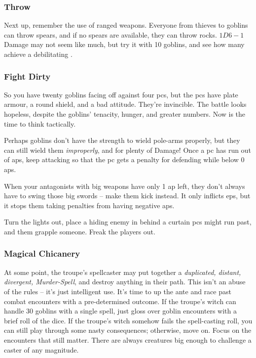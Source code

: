 \begin{multicols}{2}
\subsubsection{Throw}

Next up, remember the use of ranged weapons.
Everyone from thieves to goblins can throw spears, and if no spears are available, they can throw rocks.
$1D6-1$ Damage may not seem like much, but try it with 10 goblins, and see how many achieve a debilitating .

\subsubsection{Fight Dirty}

So you have twenty goblins facing off against four \glspl{pc}, but the \glspl{pc} have plate armour, a round shield, and a bad attitude.
They're invincible.
The battle looks hopeless, despite the goblins' tenacity, hunger, and greater numbers.
Now is the time to think tactically.

Perhaps goblins don't have the strength to wield pole-arms properly, but they can still wield them \emph{improperly}, and for plenty of Damage!
Once a \gls{pc} has run out of \glspl{ap}, keep attacking so that the \gls{pc} gets a penalty for defending while below 0 \glspl{ap}.

When your antagonists with big weapons have only 1 \gls{ap} left, they don't always have to swing those big swords -- make them kick instead.
It only inflicts \glspl{ep}, but it stops them taking penalties from having negative \glspl{ap}.

Turn the lights out, place a hiding enemy in behind a curtain \glspl{pc} might run past, and them grapple someone.
Freak the players out.

\subsubsection{Magical Chicanery}

At some point, the troupe's spellcaster may put together a \textit{duplicated, distant, divergent, Murder-Spell}, and destroy anything in their path.
This isn't an abuse of the rules -- it's just intelligent use.
It's time to up the ante and race past combat encounters with a pre-determined outcome.
If the troupe's witch can handle 30 goblins with a single spell, just gloss over goblin encounters with a brief roll of the dice.
If the troupe's witch somehow fails the spell-casting roll, you can still play through some nasty consequences; otherwise, move on.
Focus on the encounters that still matter.
There are always creatures big enough to challenge a caster of any magnitude.


\end{multicols}
